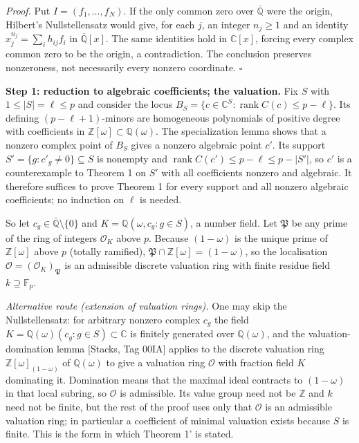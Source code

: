 \documentclass[
  11pt,
  a4paper,
]{article}
\newcounter{none} %
\begin{document}
\emph{Proof.} Put \(I=(f_1,\allowbreak{}\ldots,\allowbreak{}f_N)\). If the only common zero over
\(\overline{\mathbb Q}\) were the origin, Hilbert's Nullstellensatz
would give, for each \(j\), an integer \(n_j\ge1\) and an identity
\(x_j^{n_j}=\sum_i h_{ij}f_i\) in \(\overline{\mathbb Q}[x]\). The same
identities hold in \(\mathbb C[x]\), forcing every complex common zero
to be the origin, a contradiction. The conclusion preserves nonzeroness,
not necessarily every nonzero coordinate. \(\square\)

\textbf{Step 1: reduction to algebraic coefficients; the valuation.} Fix
\(S\) with \(1\le|S|=\ell\le p\) and consider the locus
\(B_S=\{c\in\mathbb C^S:\operatorname{rank}C(c)\le p-\ell\}\). Its
defining \((p-\ell+1)\)-minors are homogeneous polynomials of positive
degree with coefficients in
\(\mathbb Z[\omega]\subset\mathbb Q(\omega)\). The specialization lemma
shows that a nonzero complex point of \(B_S\) gives a nonzero algebraic
point \(c'\). Its support \(S'=\{g:c'_g\ne0\}\subseteq S\) is nonempty
and \(\operatorname{rank}C(c')\le p-\ell\le p-|S'|\), so \(c'\) is a
counterexample to Theorem 1 on \(S'\) with all coefficients nonzero and
algebraic. It therefore suffices to prove Theorem 1 for every support
and all nonzero algebraic coefficients; no induction on \(\ell\) is
needed.

So let \(c_g\in\bar{\mathbb Q}\setminus\{0\}\) and
\(K=\mathbb Q(\omega,\allowbreak{}c_g:g\in S)\), a number field. Let \(\mathfrak P\)
be any prime of the ring of integers \(\mathcal O_K\) above \(p\).
Because \((1-\omega)\) is the unique prime of \(\mathbb Z[\omega]\)
above \(p\) (totally ramified),
\(\mathfrak P\cap\mathbb Z[\omega]=(1-\omega)\), so the localisation
\(\mathcal O=(\mathcal O_K)_{\mathfrak P}\) is an admissible discrete
valuation ring with finite residue field \(k\supseteq\mathbb F_p\).

\emph{Alternative route (extension of valuation rings).} One may skip
the Nullstellensatz: for arbitrary nonzero complex \(c_g\) the field
\(K=\mathbb Q(\omega)(c_g:g\in S)\subset\mathbb C\) is finitely
generated over \(\mathbb Q(\omega)\), and the valuation-domination lemma
{[}Stacks, Tag 00IA{]} applies to the discrete valuation ring
\(\mathbb Z[\omega]_{(1-\omega)}\) of \(\mathbb Q(\omega)\) to give a
valuation ring \(\mathcal O\) with fraction field \(K\) dominating it.
Domination means that the maximal ideal contracts to \((1-\omega)\) in
that local subring, so \(\mathcal O\) is admissible. Its value group
need not be \(\mathbb Z\) and \(k\) need not be finite, but the rest of
the proof uses only that \(\mathcal O\) is an admissible valuation ring;
in particular a coefficient of minimal valuation exists because \(S\) is
finite. This is the form in which Theorem 1' is stated.
\end{document}
